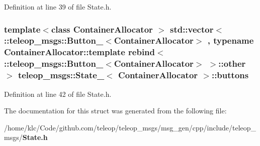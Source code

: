 Definition at line 39 of file State.h.

\subsubsection[{buttons}]{\setlength{\rightskip}{0pt plus 5cm}template$<$class ContainerAllocator $>$ std::vector$<$ ::{\bf teleop\_\-msgs::Button\_\-}$<$ContainerAllocator$>$ , typename ContainerAllocator::template rebind$<$ ::{\bf teleop\_\-msgs::Button\_\-}$<$ContainerAllocator$>$ $>$::other $>$ {\bf teleop\_\-msgs::State\_\-}$<$ ContainerAllocator $>$::{\bf buttons}}\label{structteleop__msgs_1_1State___ae70aec395eff33e08c0275256b0acf46}


Definition at line 42 of file State.h.



The documentation for this struct was generated from the following file:\begin{DoxyCompactItemize}
\item 
/home/klc/Code/github.com/teleop/teleop\_\-msgs/msg\_\-gen/cpp/include/teleop\_\-msgs/{\bf State.h}\end{DoxyCompactItemize}
